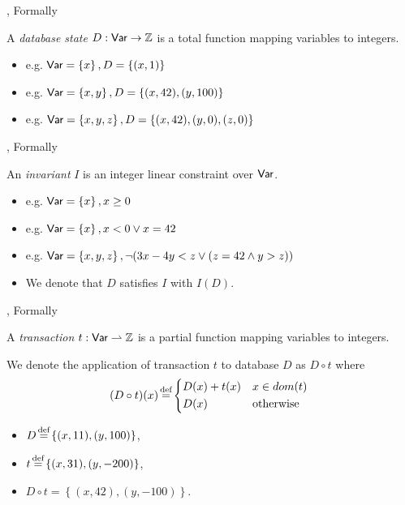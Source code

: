 \documentclass[xcolor={dvipsnames,svgnames,table}]{beamer}
\newcommand{\defeq}{\stackrel{\mathclap{\normalfont\mbox{\scriptsize def}}}{=}}
\newcommand{\set}[1]{\left\{#1\right\}}
\begin{document}
\begin{frame}{\iconfluence{}, Formally}
  \begin{center}
    \huge
    A \emph{database state} $D: \textsf{Var} \to \mathbb{Z}$ is a total function mapping
    variables to integers.
  \end{center}
  \begin{itemize}
    \item e.g. $\var = \set{x}, D = \set{(x, 1)}$
    \item e.g. $\var = \set{x, y}, D = \set{(x, 42), (y, 100)}$
    \item e.g. $\var = \set{x, y, z}, D = \set{(x, 42), (y, 0), (z, 0)}$
  \end{itemize}
\end{frame}

\begin{frame}{\iconfluence{}, Formally}
  \begin{center}
    \huge
    An \emph{invariant} $I$ is an integer linear constraint over $\textsf{Var}$.
  \end{center}
  \begin{itemize}
    \item e.g. $\var = \set{x}, x \geq 0$
    \item e.g. $\var = \set{x}, x < 0 \lor x = 42$
    \item e.g. $\var = \set{x, y, z},
                \lnot(3x - 4y < z \lor (z = 42 \land y > z))$
    \item We denote that $D$ satisfies $I$ with $I(D)$.
  \end{itemize}
\end{frame}

\begin{frame}{\iconfluence{}, Formally}
  \begin{center}
    \huge
    A \emph{transaction} $t: \textsf{Var} \rightharpoonup \mathbb{Z}$ is a partial function
    mapping variables to integers.
  \end{center}
  We denote the application of transaction $t$ to database $D$ as $D \circ t$
  where
  \[
    (D \circ t)(x) \defeq \begin{cases*}
      D(x) + t(x) & $x \in dom(t)$ \\
      D(x)        & otherwise
    \end{cases*}
  \]
  \begin{itemize}
    \item $D \defeq \set{(x, 11), (y, 100)}$,
    \item $t \defeq \set{(x, 31), (y, -200)}$,
    \item $D \circ t = \set{(x, 42), (y, -100)}$.
  \end{itemize}
\end{frame}
\end{document}
